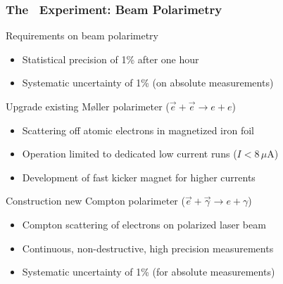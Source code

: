 \begin{frame}
 \frametitle{The \Qweak\ Experiment: Beam Polarimetry}
 \begin{block}{Requirements on beam polarimetry}
  \begin{itemize}
   \item Statistical precision of 1\% after one hour
   \item Systematic uncertainty of 1\% (on absolute measurements)
  \end{itemize}
 \end{block}
 \begin{block}{Upgrade \alert{existing M\o{}ller polarimeter} ($\vec{e} + \vec{e} \to e + e$)}
  \begin{itemize}
   \item Scattering off atomic electrons in magnetized iron foil
   \item Operation limited to \alert{dedicated low current runs} ($I < 8$\,$\mu$A)
   \item Development of fast kicker magnet for higher currents
  \end{itemize}
 \end{block}
 \begin{block}{Construction \alert{new Compton polarimeter} ($\vec{e} + \vec{\gamma} \to e + \gamma$)}
  \begin{itemize}
   \item Compton scattering of electrons on polarized laser beam
   \item \alert{Continuous, non-destructive, high precision} measurements
   \item Systematic uncertainty of 1\% (for absolute measurements)
  \end{itemize}
 \end{block}
\end{frame}
